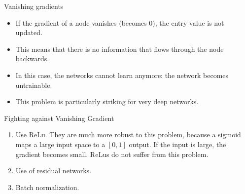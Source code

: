 \documentclass[handout,xcolor=pdftex,dvipsnames,table,mathserif]{beamer}
\begin{document}



\begin{frame}{Vanishing gradients}
\begin{itemize}
\item If the gradient of a node vanishes (becomes 0), the entry value is not updated. 
\item This means that there is no information that flows through the node backwards. 
\item In this case, the networks cannot learn anymore: the network becomes untrainable. 
\item This problem is particularly striking for very deep networks. 
\end{itemize}
\end{frame}


\begin{frame}{Fighting against Vanishing Gradient}
\begin{enumerate}
\item Use ReLu. They are much more robust to this problem, because a sigmoid maps a large input space to a $[0,1]$ output. If the input is large, the gradient becomes small. ReLus do not suffer from this problem. 
\item Use of residual networks.
\item Batch normalization.
\end{enumerate}
\end{frame}
\end{document}
